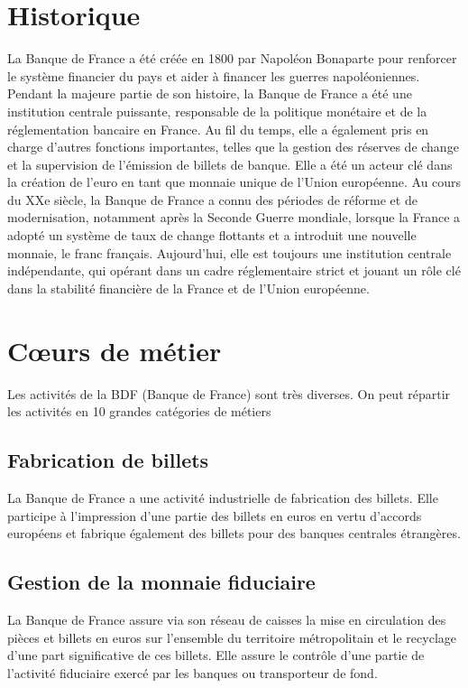 \documentclass{report}
\begin{document}
\section{Historique}
La Banque de France a été créée en 1800 par Napoléon Bonaparte pour renforcer le système financier du pays et aider à financer les guerres napoléoniennes. Pendant la majeure partie de son histoire, la Banque de France a été une institution centrale puissante, responsable de la politique monétaire et de la réglementation bancaire en France.
Au fil du temps, elle a également pris en charge d'autres fonctions importantes, telles que la gestion des réserves de change et la supervision de l'émission de billets de banque. Elle a été un acteur clé dans la création de l'euro en tant que monnaie unique de l'Union européenne.
Au cours du XXe siècle, la Banque de France a connu des périodes de réforme et de modernisation, notamment après la Seconde Guerre mondiale, lorsque la France a adopté un système de taux de change flottants et a introduit une nouvelle monnaie, le franc français.
Aujourd'hui, elle est toujours une institution centrale indépendante, qui opérant dans un cadre réglementaire strict et jouant un rôle clé dans la stabilité financière de la France et de l'Union européenne.


\section{Cœurs de métier}
Les activités de la BDF (Banque de France) sont très diverses. On peut répartir les activités en 10 grandes catégories de métiers \cite{BdfLesMetiers}

\subsection{Fabrication de billets}
La Banque de France a une activité industrielle de fabrication des billets. Elle participe à l'impression d'une partie des billets en euros en vertu d'accords européens et fabrique également des billets pour des banques centrales étrangères.

\subsection{Gestion de la monnaie fiduciaire}
La Banque de France assure via son réseau de caisses la mise en circulation des pièces et billets en euros sur l’ensemble du territoire métropolitain et le recyclage d’une part significative de ces billets.
Elle assure le contrôle d'une partie de l'activité fiduciaire exercé par les banques ou transporteur de fond.
\end{document}
